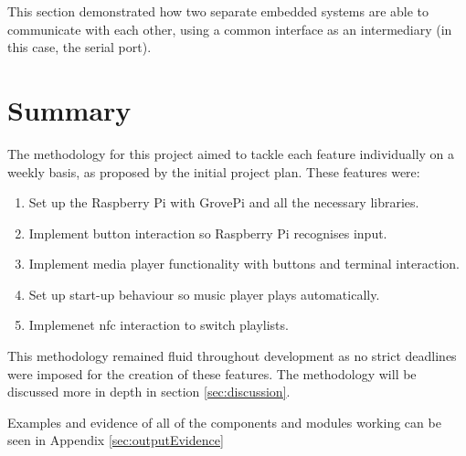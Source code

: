 This section demonstrated how two separate embedded systems are able to communicate with each other, using a common interface as an intermediary (in this case, the serial port).

\section{Summary}\label{sec:summary}
The methodology for this project aimed to tackle each feature individually on a weekly basis, as proposed by the initial project plan. These features were:
\begin{enumerate}
    \item Set up the Raspberry Pi with GrovePi and all the necessary libraries.
    \item Implement button interaction so Raspberry Pi recognises input.
    \item Implement media player functionality with buttons and terminal interaction.
    \item Set up start-up behaviour so music player plays automatically.
    \item Implemenet \gls{nfc} interaction to switch playlists.
\end{enumerate}
This methodology remained fluid throughout development as no strict deadlines were imposed for the creation of these features. The methodology will be discussed more in depth in section \ref{sec:discussion}.

Examples and evidence of all of the components and modules working can be seen in Appendix \ref{sec:outputEvidence}